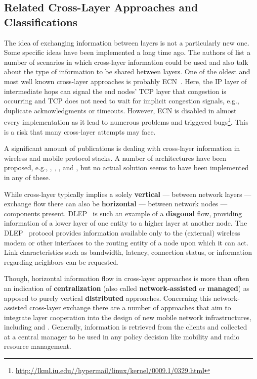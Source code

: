 \subsection{Related Cross-Layer Approaches and Classifications}

The idea of exchanging information between layers is not a particularly new one. Some specific ideas have been implemented a long time ago. The authors of \cite{Raisinghani2004720} list a number of scenarios in which cross-layer information could be used and also talk about the type of information to be shared between layers. One of the oldest and most well known cross-layer approaches is probably \gls{ECN}~\cite{rfc3168}. Here, the \gls{IP} layer of intermediate hops can signal the end nodes' \gls{TCP} layer that congestion is occurring and \gls{TCP} does not need to wait for implicit congestion signals, e.g., duplicate acknowledgments or timeouts. However, \gls{ECN} is disabled in almost every implementation as it lead to numerous problems and triggered bugs\footnote{\url{http://lkml.iu.edu//hypermail/linux/kernel/0009.1/0329.html}}. This is a risk that many cross-layer attempts may face.

A significant amount of publications is dealing with cross-layer information in wireless and mobile protocol stacks. A number of architectures have been proposed, e.g., \cite{raisinghani2004eclair, 1580937}, \cite{wang2003multi}, \cite{1200522}, and \cite{krishna2007cross}, but no actual solution seems to have been implemented in any of these.

While cross-layer typically implies a solely \textbf{vertical} --- between network layers --- exchange flow there can also be \textbf{horizontal} --- between network nodes --- components present. \gls{DLEP}~\cite{ietf2013dlepdraft} is such an example of a \textbf{diagonal} flow, providing information of a lower layer of one entity to a higher layer at another node. The \gls{DLEP}~\cite{ietf2013dlepdraft,6379143} protocol provides information available only to the (external) wireless modem or other interfaces to the routing entity of a node upon which it can act. Link characteristics such as bandwidth, latency, connection status, or information regarding neighbors can be requested.

Though, horizontal information flow in cross-layer approaches is more than often an indication of \textbf{centralization} (also called \textbf{network-assisted} or \textbf{managed}) as apposed to purely vertical \textbf{distributed} approaches. Concerning this network-assisted cross-layer exchange there are a number of approaches that aim to integrate layer cooperation into the design of new mobile network infrastructures, including \cite{zarai2010seamless} and \cite{Piamrat20111066}. Generally, information is retrieved from the clients and collected at a central manager to be used in any policy decision like mobility and radio resource management.

